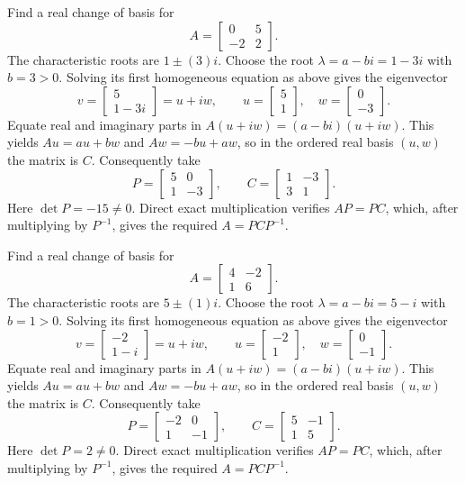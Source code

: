 \goal Find a real change of basis for
\[A=\begin{bmatrix}0&5\\-2&2\end{bmatrix}.\]
The characteristic roots are $1\pm(3)i$. Choose the root $\lambda=a-bi=1 - 3 i$ with $b=3>0$. Solving its first homogeneous equation as above gives the eigenvector
\[v=\begin{bmatrix}5\\1 - 3 i\end{bmatrix}=u+iw,\qquad u=\begin{bmatrix}5\\1\end{bmatrix},\quad w=\begin{bmatrix}0\\-3\end{bmatrix}.\]
Equate real and imaginary parts in $A(u+iw)=(a-bi)(u+iw)$. This yields $Au=au+bw$ and $Aw=-bu+aw$, so in the ordered real basis $(u,w)$ the matrix is $C$. Consequently take
\[P=\begin{bmatrix}5&0\\1&-3\end{bmatrix},\qquad C=\begin{bmatrix}1&-3\\3&1\end{bmatrix}.\]
Here $\det P=-15\ne0$. Direct exact multiplication verifies $AP=PC$, which, after multiplying by $P^{-1}$, gives the required $A=PCP^{-1}$.


\goal Find a real change of basis for
\[A=\begin{bmatrix}4&-2\\1&6\end{bmatrix}.\]
The characteristic roots are $5\pm(1)i$. Choose the root $\lambda=a-bi=5 - i$ with $b=1>0$. Solving its first homogeneous equation as above gives the eigenvector
\[v=\begin{bmatrix}-2\\1 - i\end{bmatrix}=u+iw,\qquad u=\begin{bmatrix}-2\\1\end{bmatrix},\quad w=\begin{bmatrix}0\\-1\end{bmatrix}.\]
Equate real and imaginary parts in $A(u+iw)=(a-bi)(u+iw)$. This yields $Au=au+bw$ and $Aw=-bu+aw$, so in the ordered real basis $(u,w)$ the matrix is $C$. Consequently take
\[P=\begin{bmatrix}-2&0\\1&-1\end{bmatrix},\qquad C=\begin{bmatrix}5&-1\\1&5\end{bmatrix}.\]
Here $\det P=2\ne0$. Direct exact multiplication verifies $AP=PC$, which, after multiplying by $P^{-1}$, gives the required $A=PCP^{-1}$.



